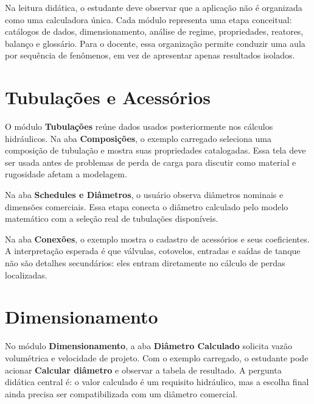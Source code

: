 Na leitura didática, o estudante deve observar que a aplicação não é organizada como uma calculadora única. Cada módulo representa uma etapa conceitual: catálogos de dados, dimensionamento, análise de regime, propriedades, reatores, balanço e glossário. Para o docente, essa organização permite conduzir uma aula por sequência de fenômenos, em vez de apresentar apenas resultados isolados.

\section{Tubulações e Acessórios}

O módulo \textbf{Tubulações} reúne dados usados posteriormente nos cálculos hidráulicos. Na aba \textbf{Composições}, o exemplo carregado seleciona uma composição de tubulação e mostra suas propriedades catalogadas. Essa tela deve ser usada antes de problemas de perda de carga para discutir como material e rugosidade afetam a modelagem.


Na aba \textbf{Schedules e Diâmetros}, o usuário observa diâmetros nominais e dimensões comerciais. Essa etapa conecta o diâmetro calculado pelo modelo matemático com a seleção real de tubulações disponíveis.


Na aba \textbf{Conexões}, o exemplo mostra o cadastro de acessórios e seus coeficientes. A interpretação esperada é que válvulas, cotovelos, entradas e saídas de tanque não são detalhes secundários: eles entram diretamente no cálculo de perdas localizadas.


\section{Dimensionamento}

No módulo \textbf{Dimensionamento}, a aba \textbf{Diâmetro Calculado} solicita vazão volumétrica e velocidade de projeto. Com o exemplo carregado, o estudante pode acionar \textbf{Calcular diâmetro} e observar a tabela de resultado. A pergunta didática central é: o valor calculado é um requisito hidráulico, mas a escolha final ainda precisa ser compatibilizada com um diâmetro comercial.


